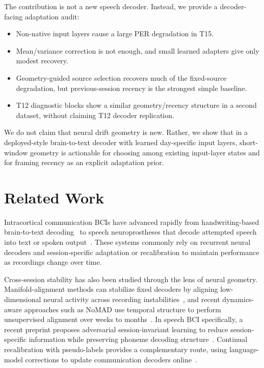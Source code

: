 \documentclass[10pt]{article}
\begin{document}
The contribution is not a new speech decoder. Instead, we provide a decoder-facing
adaptation audit:
\begin{itemize}
    \item Non-native input layers cause a large PER degradation in T15.
    \item Mean/variance correction is not enough, and small learned adapters give
    only modest recovery.
    \item Geometry-guided source selection recovers much of the fixed-source
    degradation, but previous-session recency is the strongest simple baseline.
    \item T12 diagnostic blocks show a similar geometry/recency structure in a
    second dataset, without claiming T12 decoder replication.
\end{itemize}

We do not claim that neural drift geometry is new. Rather, we show that in a
deployed-style brain-to-text decoder with learned day-specific input layers,
short-window geometry is actionable for choosing among existing input-layer
states and for framing recency as an explicit adaptation prior.

\section{Related Work}
Intracortical communication BCIs have advanced rapidly from handwriting-based
brain-to-text decoding~\cite{willett2021handwriting,fan2023corp} to speech
neuroprostheses that decode attempted speech into text or spoken
output~\cite{willett2023speech,card2024accurate}. These systems commonly rely on
recurrent neural decoders and session-specific adaptation or recalibration to
maintain performance as recordings change over time.

Cross-session stability has also been studied through the lens of neural
geometry. Manifold-alignment methods can stabilize fixed decoders by aligning
low-dimensional neural activity across recording instabilities~\cite{degenhart2020stabilization},
and recent dynamics-aware approaches such as NoMAD use temporal structure to
perform unsupervised alignment over weeks to months~\cite{karpowicz2025nomad}.
In speech BCI specifically, a recent preprint proposes adversarial
session-invariant learning to reduce session-specific information while
preserving phoneme decoding structure~\cite{zhang2026align}. Continual
recalibration with pseudo-labels provides a complementary route, using
language-model corrections to update communication decoders online~\cite{fan2023corp}.
\end{document}
